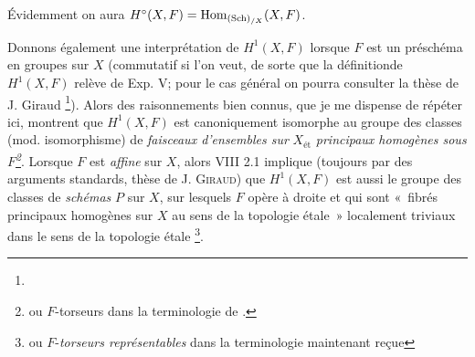 \documentclass[10pt]{../fichiers-configuration-latex/smfart}
\begin{document}
\begin{enumerate}
Évidemment on aura $H^{\circ}(X, F) = \operatorname{Hom}_{(\operatorname{Sch})_{/X}} (X, F)$.

Donnons également une interprétation de $H^1(X, F)$ lorsque $F$ est
un préschéma en groupes sur $X$ (commutatif si l'on veut, de sorte
que la définition\pageoriginale de $H^{1}(X, F)$ relève de Exp. V;
pour le cas général on pourra consulter la thèse de J. Giraud
\footnote{}). Alors des raisonnements bien connus, que
je me dispense de répéter ici, montrent que $H^1 (X, F)$ est
canoniquement isomorphe au groupe des classes (mod. isomorphisme) de
\emph{faisceaux d'ensembles sur} $X_{\text{ét}}$
  \emph{principaux homogènes sous $F$\footnote{ou $F$-torseurs dans la
    terminologie de \loccit.}}. Lorsque $F$ est \emph{affine} sur
$X$, alors  VIII 2.1 implique (toujours par des arguments
standards, \cf thèse de J. \textsc{Giraud}) que $H^{1} (X, F)$ est aussi le
groupe des classes de \emph{schémas} $P$ sur $X$, sur lesquels $F$
opère à droite et qui sont « fibrés principaux homogènes sur $X$ au
sens de la topologie étale » \ie localement triviaux dans le sens de
la topologie étale \footnote{ou $F$-\emph{torseurs représentables}
  dans la terminologie maintenant reçue}.
 \end{enumerate}
\end{document}
